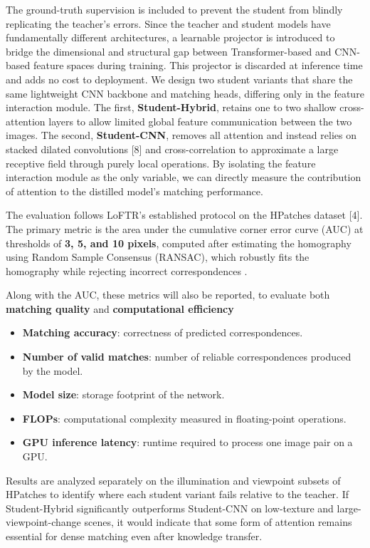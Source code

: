 \documentclass{article}
\begin{document}
The ground-truth supervision is included to prevent the student from blindly replicating the teacher's errors. Since the teacher and student models have fundamentally different architectures, a learnable projector is introduced to bridge the dimensional and structural gap between Transformer-based and CNN-based feature spaces during training. This projector is discarded at inference time and adds no cost to deployment.
We design two student variants that share the same lightweight CNN backbone and matching heads, differing only in the feature interaction module. The first, \textbf{Student-Hybrid}, retains one to two shallow cross-attention layers to allow limited global feature communication between the two images. The second, \textbf{Student-CNN}, removes all attention and instead relies on stacked dilated convolutions [8] and cross-correlation to approximate a large receptive field through purely local operations. By isolating the feature interaction module as the only variable, we can directly measure the contribution of attention to the distilled model's matching performance.

The evaluation follows LoFTR's established protocol on the HPatches dataset [4]. The primary metric is the area under the cumulative corner error curve (AUC) at thresholds of \textbf{3, 5, and 10 pixels}, computed after estimating the homography using Random Sample Consensus (RANSAC), which robustly fits the homography while rejecting incorrect correspondences . 

Along with the AUC, these metrics will also be reported, to evaluate both \textbf{matching quality} and \textbf{computational efficiency}
\begin{itemize}
\item \textbf{Matching accuracy}: correctness of predicted correspondences.
\item \textbf{Number of valid matches}: number of reliable correspondences produced by the model.
\item \textbf{Model size}: storage footprint of the network.
\item \textbf{FLOPs}: computational complexity measured in floating-point operations.
\item \textbf{GPU inference latency}: runtime required to process one image pair on a GPU.
\end{itemize}
Results are analyzed separately on the illumination and viewpoint subsets of HPatches to identify where each student variant fails relative to the teacher. If Student-Hybrid significantly outperforms Student-CNN on low-texture and large-viewpoint-change scenes, it would indicate that some form of attention remains essential for dense matching even after knowledge transfer.
\end{document}
